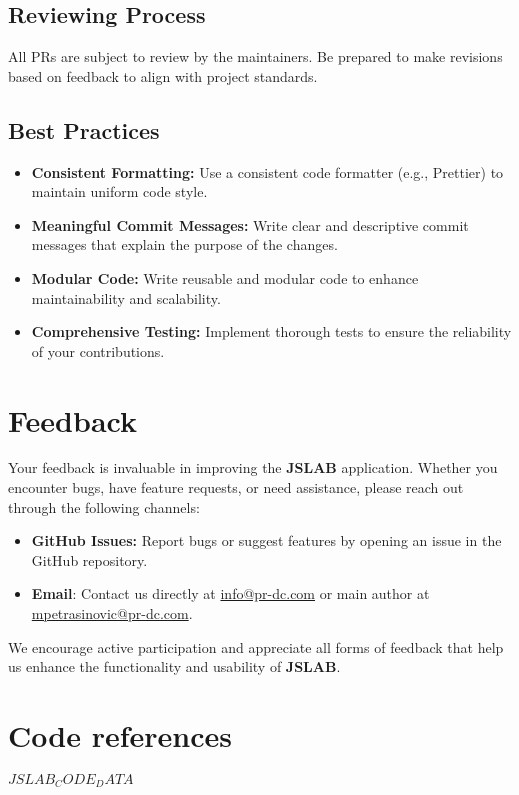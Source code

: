 \documentclass[12pt,a4paper]{article}
\begin{document}
\subsection{Reviewing Process}
All PRs are subject to review by the maintainers. Be prepared to make revisions based on feedback to align with project standards.

\subsection{Best Practices}

\begin{itemize}
    \item \textbf{Consistent Formatting:} Use a consistent code formatter (e.g., Prettier) to maintain uniform code style.

    \item \textbf{Meaningful Commit Messages:} Write clear and descriptive commit messages that explain the purpose of the changes.

    \item \textbf{Modular Code:} Write reusable and modular code to enhance maintainability and scalability.

    \item \textbf{Comprehensive Testing:} Implement thorough tests to ensure the reliability of your contributions.
\end{itemize}

\section{Feedback}

Your feedback is invaluable in improving the \textbf{JSLAB} application. Whether you encounter bugs, have feature requests, or need assistance, please reach out through the following channels:

\begin{itemize}
    \item \textbf{GitHub Issues:} Report bugs or suggest features by opening an issue in the GitHub repository.
    
    \item \textbf{Email}: Contact us directly at \href{mailto:info@pr-dc.com}{info@pr-dc.com} or main author at \href{mailto:mpetrasinovic@pr-dc.com}{mpetrasinovic@pr-dc.com}.
\end{itemize}

We encourage active participation and appreciate all forms of feedback that help us enhance the functionality and usability of \textbf{JSLAB}.

\section{Code references}

$JSLAB_CODE_DATA$

\end{document}

